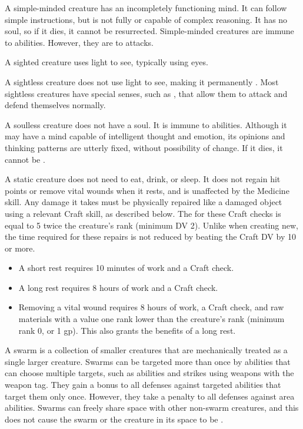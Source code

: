   A simple-minded creature has an incompletely functioning mind.
  It can follow simple instructions, but is not fully  or capable of complex reasoning.
  It has no soul, so if it dies, it cannot be resurrected.
  Simple-minded creatures are immune to  abilities.
  However, they are \vulnerable to  attacks.

  A sighted creature uses light to see, typically using eyes.

  A sightless creature does not use light to see, making it permanently \blinded.
  Most sightless creatures have special senses, such as , that allow them to attack and defend themselves normally.

  A soulless creature does not have a soul.
  It is immune to \atSoul abilities.
  Although it may have a mind capable of intelligent thought and emotion, its opinions and thinking patterns are utterly fixed, without possibility of change.
  If it dies, it cannot be .

  A static creature does not need to eat, drink, or sleep.
  It does not regain hit points or remove vital wounds when it rests, and is unaffected by the Medicine skill.
  Any damage it takes must be physically repaired like a damaged object using a relevant Craft skill, as described below.
  The  for these Craft checks is equal to 5 \add twice the creature's rank (minimum DV 2).
  Unlike when creating new, the time required for these repairs is not reduced by beating the Craft DV by 10 or more.
  \begin{itemize}
    \item A short rest requires 10 minutes of work and a Craft check.
    \item A long rest requires 8 hours of work and a Craft check.
    \item Removing a vital wound requires 8 hours of work, a Craft check, and raw materials with a value one rank lower than the creature's rank (minimum rank 0, or 1 gp). This also grants the benefits of a long rest.  
  \end{itemize}

  A swarm is a collection of smaller creatures that are mechanically treated as a single larger creature.
  Swarms can be targeted more than once by  abilities that can choose multiple targets, such as  abilities and strikes using weapons with the  weapon tag.
  They gain a  bonus to all defenses against targeted abilities that target them only once.
  However, they take a  penalty to all defenses against area abilities.
  Swarms can freely share space with other non-swarm creatures, and this does not cause the swarm or the creature in its space to be \squeezing.

